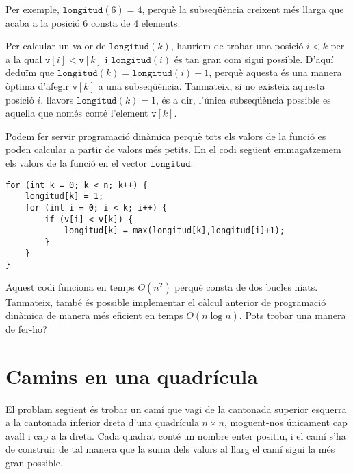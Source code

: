 Per exemple, $\texttt{longitud}(6)=4$,
perquè la subseqüència creixent més llarga
que acaba a la posició 6 consta de 4 elements.

Per calcular un valor de $\texttt{longitud}(k)$,
hauríem de trobar una posició $i<k$
per a la qual $\texttt{v}[i]<\texttt{v}[k]$
i $\texttt{longitud}(i)$ és tan gran com sigui possible.
D'aquí deduïm que
$\texttt{longitud}(k)=\texttt{longitud}(i)+1$,
perquè aquesta és una manera òptima d'afegir
$\texttt{v}[k]$ a una subseqüència.
Tanmateix, si no existeix aquesta posició $i$,
llavors $\texttt{longitud}(k)=1$,
és a dir, l'única subseqüència possible es aquella
que només conté l'element $\texttt{v}[k]$.

Podem fer servir programació dinàmica perquè tots els valors de la
funció es poden calcular a partir de valors més petits.
En el codi següent emmagatzemem els valors de la funció en
el vector
$\texttt{longitud}$.

\begin{lstlisting}
for (int k = 0; k < n; k++) {
    longitud[k] = 1;
    for (int i = 0; i < k; i++) {
        if (v[i] < v[k]) {
            longitud[k] = max(longitud[k],longitud[i]+1);
        }
    }
}
\end{lstlisting}

Aquest codi funciona en temps $O(n^2)$
perquè consta de dos bucles niats.
Tanmateix, també és possible implementar el
càlcul anterior de programació dinàmica
de manera més eficient en temps $O(n \log n)$.
Pots trobar una manera de fer-ho?

\section{Camins en una quadrícula}

El problam següent és trobar un camí
que vagi de la cantonada superior esquerra a
la cantonada inferior dreta
d'una quadrícula $n \times n$, moguent-nos únicament
cap avall i cap a la dreta.
Cada quadrat conté un nombre enter positiu,
i el camí s'ha de construir de tal manera
que la suma dels valors al llarg
el camí sigui la més gran possible.

